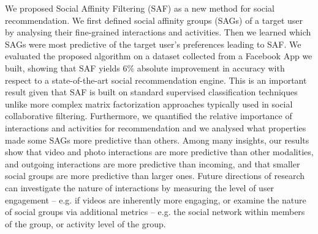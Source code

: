
We proposed Social Affinity Filtering (SAF) as a new method for social
recommendation.  We first defined social affinity groups (SAGs) of a
target user by analysing their fine-grained interactions and
activities.  Then we learned which SAGs were most predictive of the
target user's preferences leading to SAF.  We evaluated the proposed
algorithm on a dataset collected from a Facebook App we built, showing
that SAF yields 6\% absolute improvement in accuracy with respect to a
state-of-the-art social recommendation engine.  This is an important
result given that SAF is built on standard supervised classification
techniques unlike more complex matrix factorization approaches
typically used in social collaborative filtering.  Furthermore, we
quantified the relative importance of interactions and activities for
recommendation and we analysed what properties made some SAGs
more predictive than others.  Among many insights, our results show
that video and photo interactions are more predictive than other
modalities, and outgoing interactions are more predictive than
incoming, and that smaller social groups are more predictive than
larger ones.  Future directions of research can investigate the nature
of interactions by measuring the level of user engagement -- e.g. if
videos are inherently more engaging, or examine the nature of social
groups via additional metrics -- e.g. the social network within
members of the group, or activity level of the group.
